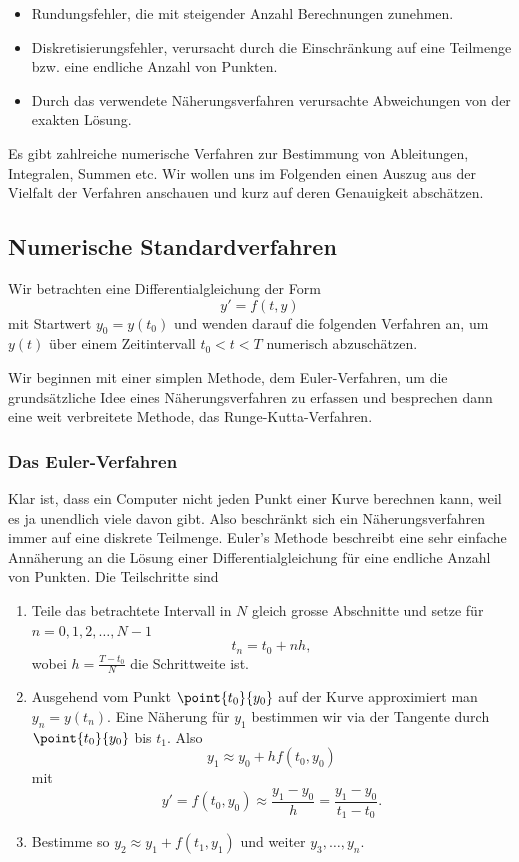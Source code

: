 \documentclass[%
11pt,%
twoside,%
titlepage,%
german,%
headsepline%
]{scrartcl}
\begin{document}
\begin{itemize}
\item Rundungsfehler, die mit steigender Anzahl Berechnungen zunehmen.
\item Diskretisierungsfehler, verursacht durch die Einschr\"ankung auf eine Teilmenge bzw. eine endliche Anzahl von Punkten.
\item Durch das verwendete N\"aherungsverfahren verursachte Abweichungen von der exakten L\"osung.
\end{itemize}

Es gibt zahlreiche numerische Verfahren zur Bestimmung von Ableitungen, Integralen, Summen etc. Wir wollen uns im Folgenden einen Auszug aus der Vielfalt der Verfahren anschauen und kurz auf deren Genauigkeit absch\"atzen.

\subsection{Numerische Standardverfahren}

Wir betrachten eine Differentialgleichung der Form
$$y'=f(t,y)$$
mit Startwert $y_0=y(t_0)$ und wenden darauf die folgenden Verfahren an, um $y(t)$ \"uber einem Zeitintervall $t_0<t<T$ numerisch abzusch\"atzen.

Wir beginnen mit einer simplen Methode, dem Euler-Verfahren, um die grunds\"atzliche Idee eines N\"aherungsverfahren zu erfassen und besprechen dann eine weit verbreitete Methode, das Runge-Kutta-Verfahren.

\subsubsection{Das Euler-Verfahren}

Klar ist, dass ein Computer nicht jeden Punkt einer Kurve berechnen kann, weil es ja unendlich viele davon gibt. Also beschr\"ankt sich ein N\"aherungsverfahren immer auf eine diskrete Teilmenge. Euler's Methode beschreibt eine sehr einfache Ann\"aherung an die L\"osung einer Differentialgleichung f\"ur eine endliche Anzahl von Punkten. Die Teilschritte sind

\begin{enumerate}
\item Teile das betrachtete Intervall in $N$ gleich grosse Abschnitte und setze f\"ur $n=0,1,2,\dots,N-1$
$$t_n=t_0+nh,$$
wobei $h=\frac{T-t_0}{N}$ die Schrittweite ist.
\item Ausgehend vom Punkt $\point{t_0}{y_0}$ auf der Kurve approximiert man $y_n=y(t_n)$. Eine N\"aherung f\"ur $y_1$ bestimmen wir via der Tangente durch $\point{t_0}{y_0}$ bis $t_1$. Also
$$y_1\approx y_0+hf(t_0,y_0)$$
mit
$$y'=f(t_0,y_0)\approx\frac{y_1-y_0}{h}=\frac{y_1-y_0}{t_1-t_0}.$$
\item Bestimme so $y_2\approx y_1+f(t_1,y_1)$ und weiter $y_3,\dots,y_n$.
\end{enumerate}
\end{document}
